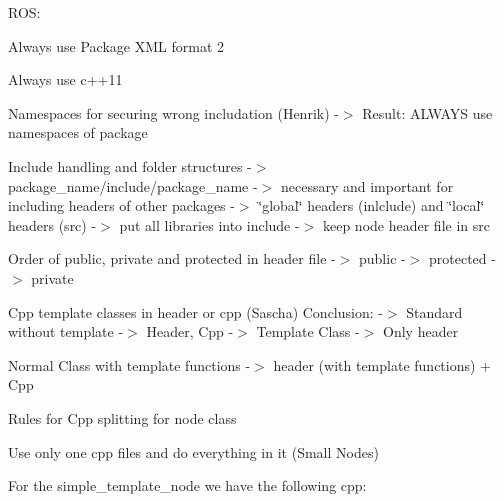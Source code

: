 \begin{DoxyEnumerate}
\item R\+OS\+:
\begin{DoxyEnumerate}
\item Always use Package X\+ML format 2
\end{DoxyEnumerate}
\begin{DoxyEnumerate}
\item Always use c++11
\end{DoxyEnumerate}
\begin{DoxyEnumerate}
\item Namespaces for securing wrong includation (Henrik) -\/$>$ Result\+: A\+L\+W\+A\+YS use namespaces of package
\end{DoxyEnumerate}
\begin{DoxyEnumerate}
\item Include handling and folder structures -\/$>$ package\+\_\+name/include/package\+\_\+name -\/$>$ necessary and important for including headers of other packages -\/$>$ \char`\"{}global\char`\"{} headers (inlclude) and \char`\"{}local\char`\"{} headers (src) -\/$>$ put all libraries into include -\/$>$ keep node header file in src
\end{DoxyEnumerate}
\begin{DoxyEnumerate}
\item Order of public, private and protected in header file -\/$>$ public -\/$>$ protected -\/$>$ private
\end{DoxyEnumerate}
\begin{DoxyEnumerate}
\item Cpp template classes in header or cpp (Sascha) Conclusion\+: -\/$>$ Standard without template -\/$>$ Header, Cpp -\/$>$ Template Class -\/$>$ Only header
\begin{DoxyItemize}
\item Normal Class with template functions -\/$>$ header (with template functions) + Cpp
\end{DoxyItemize}
\end{DoxyEnumerate}
\begin{DoxyEnumerate}
\item Rules for Cpp splitting for node class
\begin{DoxyItemize}
\item Use only one cpp files and do everything in it (Small Nodes)
\begin{DoxyItemize}
\item For the simple\+\_\+template\+\_\+node we have the following cpp\+:

\end{DoxyItemize}
\end{DoxyItemize}
\end{DoxyEnumerate}
\end{DoxyEnumerate}
